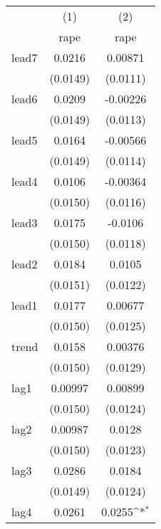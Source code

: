 {
\def\sym#1{\ifmmode^{#1}\else\(^{#1}\)\fi}
\begin{tabular}{l*{2}{c}}
\hline\hline
            &\multicolumn{1}{c}{(1)}&\multicolumn{1}{c}{(2)}\\
            &\multicolumn{1}{c}{rape}&\multicolumn{1}{c}{rape}\\
\hline
lead7       &      0.0216         &     0.00871         \\
            &    (0.0149)         &    (0.0111)         \\
[1em]
lead6       &      0.0209         &    -0.00226         \\
            &    (0.0149)         &    (0.0113)         \\
[1em]
lead5       &      0.0164         &    -0.00566         \\
            &    (0.0149)         &    (0.0114)         \\
[1em]
lead4       &      0.0106         &    -0.00364         \\
            &    (0.0150)         &    (0.0116)         \\
[1em]
lead3       &      0.0175         &     -0.0106         \\
            &    (0.0150)         &    (0.0118)         \\
[1em]
lead2       &      0.0184         &      0.0105         \\
            &    (0.0151)         &    (0.0122)         \\
[1em]
lead1       &      0.0177         &     0.00677         \\
            &    (0.0150)         &    (0.0125)         \\
[1em]
trend       &      0.0158         &     0.00376         \\
            &    (0.0150)         &    (0.0129)         \\
[1em]
lag1        &     0.00997         &     0.00899         \\
            &    (0.0150)         &    (0.0124)         \\
[1em]
lag2        &     0.00987         &      0.0128         \\
            &    (0.0150)         &    (0.0123)         \\
[1em]
lag3        &      0.0286         &      0.0184         \\
            &    (0.0149)         &    (0.0124)         \\
[1em]
lag4        &      0.0261         &      0.0255\sym{*}  \\

\end{tabular}}

